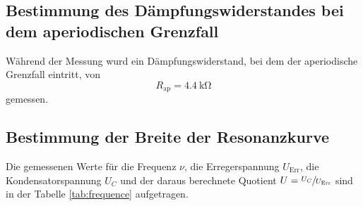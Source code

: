 \subsection{Bestimmung des Dämpfungswiderstandes bei dem aperiodischen Grenzfall}
Während der Messung wurd ein Dämpfungswiderstand, bei dem der aperiodische Grenzfall eintritt, von
\begin{equation*}
    R_\text{ap} = \SI{4.4}{\kilo\ohm}
\end{equation*}
gemessen.
\subsection{Bestimmung der Breite der Resonanzkurve}
Die gemessenen Werte für die Frequenz $\nu$, die Erregerspannung
$U_\text{Err}$, die Kondensatorspannung $U_C$ und der daraus berechnete Quotient $U = \sfrac{U_C}{U_\text{Err}}$
sind in der Tabelle \ref{tab:frequence} aufgetragen.
